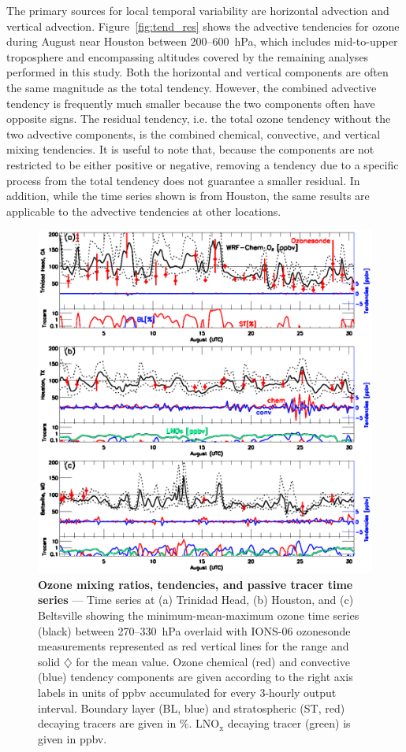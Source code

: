 The primary sources for local temporal variability are horizontal advection and vertical advection.
Figure~\ref{fig:tend_res} shows the advective tendencies for ozone during August near Houston
between 200--600~hPa, which includes mid-to-upper troposphere and encompassing altitudes covered by
the remaining analyses performed in this study. Both the horizontal and vertical components are often the same
magnitude as the total tendency. However, the combined advective tendency is frequently much
smaller because the two components often have opposite signs. The residual
tendency, i.e. the total ozone tendency without the two advective components, is the combined
chemical, convective, and vertical mixing tendencies.
It is useful to note that, because the components are not restricted to be either positive or negative,
removing a tendency due to a specific process from the total tendency does not guarantee a smaller
residual. In addition, while the time series shown is from Houston, the same results are applicable
to the advective tendencies at other locations.

 \begin{figure}
 \noindent\includegraphics[width=40pc]{Figures/tendency_ts.eps}
 \caption[Ozone mixing ratios, tendencies, and passive tracer time series]{\small
\textbf{Ozone mixing ratios, tendencies, and passive tracer time series} ---
Time series at (a) Trinidad Head, (b) Houston, and (c) Beltsville
showing the minimum-mean-maximum ozone time series (black) between
270--330~hPa overlaid with IONS-06 ozonesonde measurements
represented as red vertical lines for the range and solid $\diamondsuit$
for the mean value. Ozone chemical (red) and convective (blue) tendency
components are given according to the right axis labels in units
of ppbv accumulated for every 3-hourly output interval. Boundary layer (BL, blue)
and stratospheric (ST, red) decaying tracers are
given in \%. LNO$_{\mathrm{x}}$ decaying tracer (green) is given in ppbv.}
 \label{fig:tend_ts}
 \end{figure}


